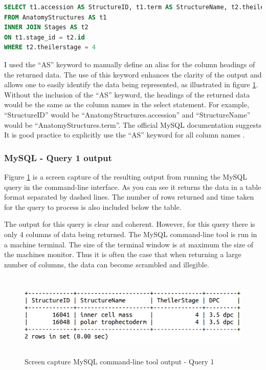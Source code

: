 \begin{lstlisting}[language=SQL, caption=MySQL Query 1 statement. All structures at Theiler Stage 4, label=code:mysqlquery1]
SELECT t1.accession AS StructureID, t1.term AS StructureName, t2.theilerstage AS TheilerStage, t2.dpc AS DPC
FROM AnatomyStructures AS t1
INNER JOIN Stages AS t2
ON t1.stage_id = t2.id
WHERE t2.theilerstage = 4
\end{lstlisting}

I used the ``AS'' keyword to manually define an alias for the column headings of the returned data. The use of this keyword enhances the clarity of the output and allows one to easily identify the data being represented, as illustrated in figure \ref{fig:mysqlquery1}. Without the inclusion of the ``AS'' keyword, the headings of the returned data would be the same as the column names in the select statement. For example, ``StructureID'' would be ``AnatomyStructures.accession'' and ``StructureName'' would be ``AnatomyStructures.term''. The official MySQL documentation suggests It is good practice to explicitly use the ``AS'' keyword for all column names \cite{mysqlworkbench}.

\subsubsection*{MySQL - Query 1 output}\label{mysqlquery1output}
Figure \ref{fig:mysqlquery1} is a screen capture of the resulting output from running the MySQL query in the command-line interface. As you can see it returns the data in a table format separated by dashed lines. The number of rows returned and time taken for the query to process is also included below the table.

The output for this query is clear and coherent. However, for this query there is only 4 columns of data being returned. The MySQL command-line tool is run in a machine terminal. The size of the terminal window is at maximum the size of the machines monitor. Thus it is often the case that when returning a large number of columns, the data can become scrambled and illegible.

\begin{figure}[H]\begin{center}\includegraphics[height=4cm,width=0.9\linewidth]{images/mysqlquery1}\caption{Screen capture MySQL command-line tool output - Query 1}\label{fig:mysqlquery1}\end{center}\end{figure}

